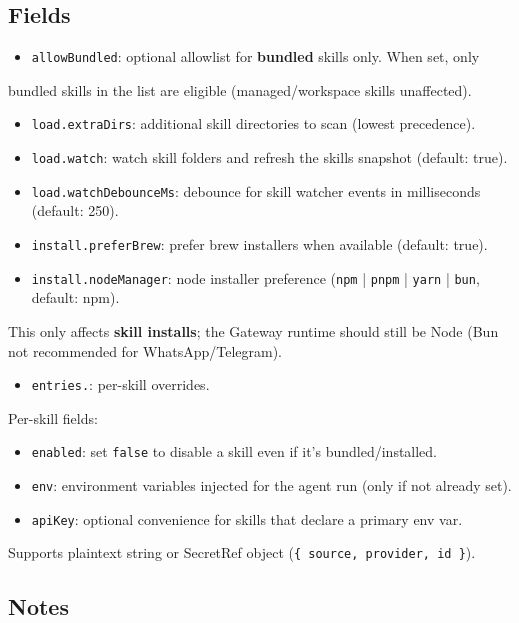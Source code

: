 \subsection{Fields}


\begin{itemize}
  \item \texttt{allowBundled}: optional allowlist for \textbf{bundled} skills only. When set, only
\end{itemize}

bundled skills in the list are eligible (managed/workspace skills unaffected).
\begin{itemize}
  \item \texttt{load.extraDirs}: additional skill directories to scan (lowest precedence).
  \item \texttt{load.watch}: watch skill folders and refresh the skills snapshot (default: true).
  \item \texttt{load.watchDebounceMs}: debounce for skill watcher events in milliseconds (default: 250).
  \item \texttt{install.preferBrew}: prefer brew installers when available (default: true).
  \item \texttt{install.nodeManager}: node installer preference (\texttt{npm} | \texttt{pnpm} | \texttt{yarn} | \texttt{bun}, default: npm).
\end{itemize}

This only affects \textbf{skill installs}; the Gateway runtime should still be Node
(Bun not recommended for WhatsApp/Telegram).
\begin{itemize}
  \item \texttt{entries.}: per-skill overrides.
\end{itemize}


Per-skill fields:

\begin{itemize}
  \item \texttt{enabled}: set \texttt{false} to disable a skill even if it’s bundled/installed.
  \item \texttt{env}: environment variables injected for the agent run (only if not already set).
  \item \texttt{apiKey}: optional convenience for skills that declare a primary env var.
\end{itemize}

Supports plaintext string or SecretRef object (\texttt{\{ source, provider, id \}}).

\subsection{Notes}



